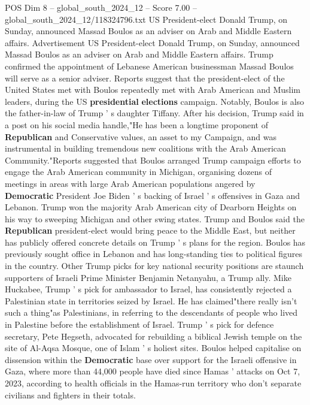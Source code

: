 \begin{textsample}{POS Dim 8 – global\_south\_2024\_12 – Score 7.00 – global\_south\_2024\_12/118324796.txt}  \label{ex:f8_pos_351}
US President-elect Donald Trump, on Sunday, announced Massad Boulos as an adviser on Arab and Middle Eastern affairs.
Advertisement US President-elect Donald Trump, on Sunday, announced Massad Boulos as an adviser on Arab and Middle Eastern affairs.
Trump confirmed the appointment of Lebanese American businessman Massad Boulos will serve as a senior adviser.
Reports suggest that the president-elect of the United States met with Boulos repeatedly met with Arab American and Muslim leaders, during the US \textbf{presidential} \textbf{elections} campaign.
Notably, Boulos is also the father-in-law of Trump ' s daughter Tiffany.
After his decision, Trump said in a post on his social media handle,"He has been a longtime proponent of \textbf{Republican} and Conservative values, an asset to my Campaign, and was instrumental in building tremendous new coalitions with the Arab American Community."Reports suggested that Boulos arranged Trump campaign efforts to engage the Arab American community in Michigan, organising dozens of meetings in areas with large Arab American populations angered by \textbf{Democratic} President Joe Biden ' s backing of Israel ' s offensives in Gaza and Lebanon.
Trump won the majority Arab American city of Dearborn Heights on his way to sweeping Michigan and other swing states.
Trump and Boulos said the \textbf{Republican} president-elect would bring peace to the Middle East, but neither has publicly offered concrete details on Trump ' s plans for the region.
Boulos has previously sought office in Lebanon and has long-standing ties to political figures in the country.
Other Trump picks for key national security positions are staunch supporters of Israeli Prime Minister Benjamin Netanyahu, a Trump ally.
Mike Huckabee, Trump ' s pick for ambassador to Israel, has consistently rejected a Palestinian state in territories seized by Israel.
He has claimed"there really isn't such a thing"as Palestinians, in referring to the descendants of people who lived in Palestine before the establishment of Israel.
Trump ' s pick for defence secretary, Pete Hegseth, advocated for rebuilding a biblical Jewish temple on the site of Al-Aqsa Mosque, one of Islam ' s holiest sites.
Boulos helped capitalise on dissension within the \textbf{Democratic} base over support for the Israeli offensive in Gaza, where more than 44,000 people have died since Hamas ' attacks on Oct 7, 2023, according to health officials in the Hamas-run territory who don't separate civilians and fighters in their totals.

\end{textsample}
